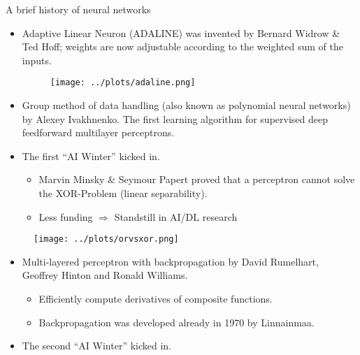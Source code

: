 \begin{vbframe}{A brief history of neural networks}
\begin{itemize}
\item {} Adaptive Linear Neuron (ADALINE) was invented by Bernard Widrow \& Ted Hoff; weights are now adjustable according to the weighted sum of the inputs.
\vspace{.1cm}
\begin{figure}
\texttt{[image: ../plots/adaline.png]}
\end{figure}
\vspace{1cm}
\item {} Group method of data handling (also known as polynomial neural networks) by Alexey Ivakhnenko. The first learning algorithm for supervised deep feedforward multilayer perceptrons.
\framebreak

\item {} The first \enquote{AI Winter} kicked in.
\begin{itemize}
\item Marvin Minsky \& Seymour Papert proved that a perceptron cannot solve the XOR-Problem (linear separability).
\item Less funding $\Rightarrow$ Standstill in AI/DL research
\end{itemize}
\end{itemize}
\begin{figure}
\texttt{[image: ../plots/orvsxor.png]}
\end{figure}
\begin{itemize}
\item {} Multi-layered perceptron with backpropagation by David Rumelhart, Geoffrey Hinton and Ronald Williams.
\begin{itemize}
\item Efficiently compute derivatives of composite functions.
\item Backpropagation was developed already in 1970 by Linnainmaa.
\end{itemize}
\framebreak

\item {} The second \enquote{AI Winter} kicked in.


\end{itemize}
\end{vbframe}
